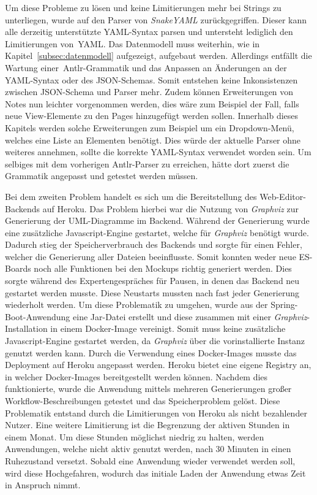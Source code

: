 Um diese Probleme zu lösen und keine Limitierungen mehr bei Strings zu unterliegen, wurde auf den Parser von \textit{SnakeYAML} zurückgegriffen.
Dieser kann alle derzeitig unterstützte YAML-Syntax parsen und untersteht lediglich den Limitierungen von~\ac{YAML}.
Das Datenmodell muss weiterhin, wie in Kapitel~\ref{subsec:datenmodell} aufgezeigt, aufgebaut werden.
Allerdings entfällt die Wartung einer~\ac{Antlr}-Grammatik und das Anpassen an Änderungen an der \ac{YAML}-Syntax oder des JSON-Schemas.
Somit entstehen keine Inkonsistenzen zwischen JSON-Schema und Parser mehr.
Zudem können Erweiterungen von Notes nun leichter vorgenommen werden, dies wäre zum Beispiel der Fall, falls neue View-Elemente zu den Pages hinzugefügt
werden sollen.
Innerhalb dieses Kapitels werden solche Erweiterungen zum Beispiel um ein Dropdown-Menü, welches eine Liste an Elementen benötigt.
Dies würde der aktuelle Parser ohne weiteres annehmen, sollte die korrekte \ac{YAML}-Syntax verwendet worden sein.
Um selbiges mit dem vorherigen \ac{Antlr}-Parser zu erreichen, hätte dort zuerst die Grammatik angepasst und getestet werden müssen.

Bei dem zweiten Problem handelt es sich um die Bereitstellung des Web-Editor-Backends auf Heroku.
Das Problem hierbei war die Nutzung von \textit{Graphviz} zur Generierung der \ac{UML}-Diagramme im Backend.
Während der Generierung wurde eine zusätzliche Javascript-Engine gestartet, welche für \textit{Graphviz} benötigt wurde.
Dadurch stieg der Speicherverbrauch des Backends und sorgte für einen Fehler, welcher die Generierung aller Dateien beeinflusste.
Somit konnten weder neue \ac{ES}-Boards noch alle Funktionen bei den Mockups richtig generiert werden.
Dies sorgte während des Expertengespräches für Pausen, in denen das Backend neu gestartet werden musste.
Diese Neustarts mussten nach fast jeder Generierung wiederholt werden.
Um diese Problematik zu umgehen, wurde aus der Spring-Boot-Anwendung eine Jar-Datei erstellt und diese zusammen mit einer \textit{Graphviz}-Installation in einem Docker-Image
vereinigt\cite*{size-problem}.
Somit muss keine zusätzliche Javascript-Engine gestartet werden, da \textit{Graphviz} über die vorinstallierte Instanz genutzt werden kann.
Durch die Verwendung eines Docker-Images musste das Deployment auf Heroku angepasst werden.
Heroku bietet eine eigene Registry an, in welcher Docker-Images bereitgestellt werden können\cite*{heroku-registry}.
Nachdem dies funktionierte, wurde die Anwendung mittels mehreren Generierungen großer Workflow-Beschreibungen getestet und das Speicherproblem gelöst.
Diese Problematik entstand durch die Limitierungen von Heroku als nicht bezahlender Nutzer\cite*{size-problem}.
Eine weitere Limitierung ist die Begrenzung der aktiven Stunden in einem Monat.
Um diese Stunden möglichst niedrig zu halten, werden Anwendungen, welche nicht aktiv genutzt werden, nach 30 Minuten in einen Ruhezustand versetzt.
Sobald eine Anwendung wieder verwendet werden soll, wird diese Hochgefahren, wodurch das initiale Laden der Anwendung etwas Zeit in Anspruch nimmt\cite*{heroku-limits}.

